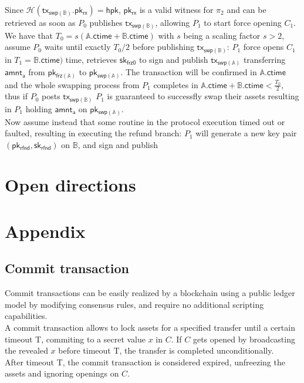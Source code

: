 \documentclass{article}      	%
\begin{document}
Since $\mathcal{H}(\mathsf{tx_{swp(\mathbb{B})}}.\mathsf{pk_{rx}}) = \mathsf{hpk}$,  $\mathsf{pk_{rx}}$ is a valid witness for $\pi_2$ and can be retrieved as soon as $P_0$ publishes $\mathsf{tx_{swp(\mathbb{B})}}$, allowing $P_1$ to start force opening $C_1$. \\
We have that $T_0 = s(\mathbb{A}.\mathsf{ctime} + \mathbb{B}.\mathsf{ctime})$ with $s$ being a scaling factor $s > 2$, assume $P_0$ waits until exactly $T_0/2$ before publishing $\mathsf{tx_{swp(\mathbb{B})}}$: $P_1$ force opens $C_1$ in $T_1 = \mathbb{B}.\mathsf{ctime})$ time, retrieves $\mathsf{sk_{frz0}}$ to sign and publish $\mathsf{tx_{swp(\mathbb{A})}}$ transferring $\mathsf{amnt_a}$ from $\mathsf{pk_{frz(\mathbb{A})}}$ to $\mathsf{pk_{swp(\mathbb{A})}}$. The transaction will be confirmed in $\mathbb{A}.\mathsf{ctime}$ and the whole swapping process from $P_1$ completes in $\mathbb{A}.\mathsf{ctime} + \mathbb{B}.\mathsf{ctime} < \frac{T_0}{2}$, thus if $P_0$ posts $\mathsf{tx_{swp(\mathbb{B})}}$ $P_1$ is guaranteed to successfly swap their assets resulting in $P_1$ holding $\mathsf{amnt_a}$ on $\mathsf{pk_{swp(\mathbb{A})}}$. \\

Now assume instead that some routine in the protocol execution timed out or faulted, resulting in executing the refund branch: $P_1$ will generate a new key pair $(\mathsf{pk_{rfnd}}, \mathsf{sk_{rfnd}})$ on $\mathbb{B}$, and sign and publish

\section{Open directions}


\printbibliography

\newpage

\appendix


\section*{Appendix}
\subsection*{Commit transaction}

Commit transactions can be easily realized by a blockchain using a public ledger model by modifying consensus rules, and require no additional scripting capabilities.  \\
A commit transaction allows to lock assets for a specified transfer until a certain timeout T, commiting to a secret value $x$ in $C$. If $C$ gets opened by broadcasting the revealed $x$ before timeout T, the transfer is completed unconditionally. \\ 
After timeout T, the commit transaction is considered expired, unfreezing the assets and ignoring openings on $C$.
\end{document}
